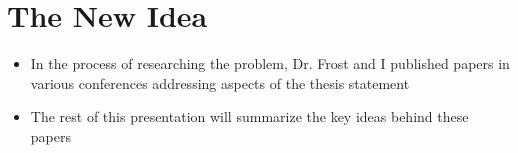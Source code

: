 \documentclass[logoontitle,tabu,supertabular,aspectratio=43]{preney-uwindsor-beamer}
\begin{document}

    \section{The New Idea}
    \begin{frame}{\insertsection}
        \begin{itemize}
            \item In the process of researching the problem, Dr. Frost and I published papers in various conferences addressing aspects of the thesis statement

            \item The rest of this presentation will summarize the key ideas behind
            these papers

        \end{itemize}
    \end{frame}

\end{document}
